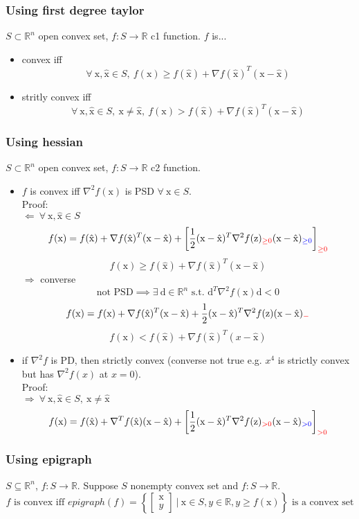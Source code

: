 \documentclass[6pt]{article}
\def\x{\textrm{x}}
\def\y{\textrm{y}}
\def\z{\textrm{z}}
\def\d{\textrm{d}}
\begin{document}
\subsubsection{Using first degree taylor}
$S\subset \mathbb{R}^n$ open convex set, $f:S\to\mathbb{R}$ c1 function. $f$ is...
\begin{itemize}
    \item convex iff $$\forall~ \x,\hat{\x} \in S, ~f(\x)\geq f(\hat{\x}) + \nabla f(\hat{\x})^T(\x-\hat{\x})$$
    \item stritly convex iff $$\forall~ \x,\hat{\x} \in S, ~\x \neq \hat{\x}, ~f(\x)>f(\hat{\x}) + \nabla f(\hat{\x})^T(\x-\hat{\x})$$
\end{itemize}
\subsubsection{Using hessian}
$S\subset \mathbb{R}^n$ open convex set, $f:S\to\mathbb{R}$ c2 function.
\begin{itemize}
    \item $f$ is convex iff $\nabla^2 f(\x)$ is PSD $\forall~ \x \in S$.\\
    Proof:\\
    $\Longleftarrow~\forall~\x, \hat{\x} \in S$
    $$f(\x) = f(\hat{\x}) + \nabla f(\hat{\x})^T(\x - \hat{\x}) + \left[\frac{1}{2}(\x - \hat{\x})^T \nabla^2f(\z) _{\color{red}\geq 0} (\x - \hat{\x})_{\color{blue}\geq 0}\right]_{\color{red}\geq 0}$$
    $$f(\x) \geq f(\hat{\x}) + \nabla f(\hat{\x})^T(\x - \hat{\x})$$
    $\Longrightarrow$ converse
    $$\textrm{not PSD} \implies \exists~ \d \in \mathbb{R}^n \textrm{ s.t. } \d^T\nabla^2f(\x)\d < 0$$
    $$f(\x) = f(\x) + \nabla f(\hat{\x})^T(\x-\hat{\x}) + \frac{1}{2}(\x - \hat{\x})^T \nabla^2f(\z)(\x - \hat{\x})_{\color{red}-}$$
    $$f(\x) < f(\hat{\x}) + \nabla f(\hat{\x})^T (x-\hat{\x})$$
    \item if $\nabla^2 f$ is PD, then strictly convex (converse not true e.g. $x^4$ is strictly convex but has $\nabla^2 f(x)$ at $x=0$).\\
    Proof:\\
    $\Longrightarrow~\forall~ \x, \hat{\x} \in S,~ \x \neq \hat{\x}$
    $$f(\x) = f(\hat{\x}) + \nabla^Tf(\hat{\x})(\x - \hat{\x}) + \left[\frac{1}{2}(\x - \hat{\x})^T \nabla^2 f(\z)_{\color{red}> 0} (\x - \hat{\x})_{\color{blue}> 0}\right]_{\color{red}>0}$$
\end{itemize}{}

\subsubsection{Using epigraph}
$S\subseteq \mathbb{R}^n$, $f:S\to \mathbb{R}$.
Suppose $S$ nonempty convex set and $f:S\to \mathbb{R}$. 
$$f \textrm{ is convex iff } epigraph(f) = \left\{  \begin{bmatrix}\x\\y\end{bmatrix}~|~ \x \in S, y \in \mathbb{R}, y\geq f(\x)  \right\}\textrm{ is a convex set}$$
\end{document}
